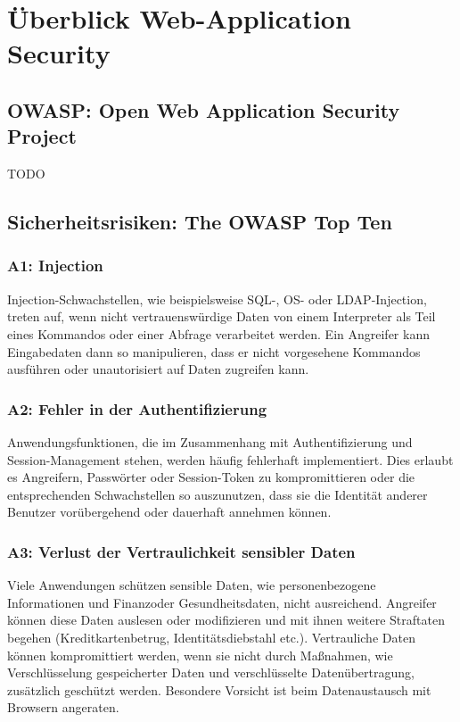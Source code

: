 \documentclass[12pt,oneside,a4paper,parskip]{scrbook}
\begin{document}
\cite{gamma2011patterns}

\chapter{Überblick Web-Application Security}

\section{OWASP: Open Web Application Security Project}
TODO

\section{Sicherheitsrisiken: The OWASP Top Ten}

\subsection{A1: Injection}
Injection-Schwachstellen, wie beispielsweise SQL-, OS- oder LDAP-Injection, treten auf, wenn
nicht vertrauenswürdige Daten von einem Interpreter als Teil eines Kommandos oder einer
Abfrage verarbeitet werden. Ein Angreifer kann Eingabedaten dann so manipulieren, dass er nicht
vorgesehene Kommandos ausführen oder unautorisiert auf Daten zugreifen kann.

\subsection{A2: Fehler in der Authentifizierung}
Anwendungsfunktionen, die im Zusammenhang mit Authentifizierung und Session-Management
stehen, werden häufig fehlerhaft implementiert. Dies erlaubt es Angreifern, Passwörter oder
Session-Token zu kompromittieren oder die entsprechenden Schwachstellen so auszunutzen,
dass sie die Identität anderer Benutzer vorübergehend oder dauerhaft annehmen können.

\subsection{A3: Verlust der Vertraulichkeit sensibler Daten}
Viele Anwendungen schützen sensible Daten, wie personenbezogene Informationen und Finanzoder
Gesundheitsdaten, nicht ausreichend. Angreifer können diese Daten auslesen oder
modifizieren und mit ihnen weitere Straftaten begehen (Kreditkartenbetrug, Identitätsdiebstahl
etc.). Vertrauliche Daten können kompromittiert werden, wenn sie nicht durch Maßnahmen, wie
Verschlüsselung gespeicherter Daten und verschlüsselte Datenübertragung, zusätzlich geschützt
werden. Besondere Vorsicht ist beim Datenaustausch mit Browsern angeraten.
\end{document}
